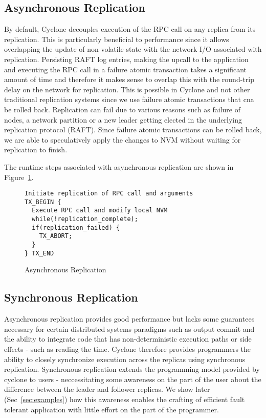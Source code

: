 \documentclass[twocolumn]{article}
\begin{document}
\subsection{Asynchronous Replication}
By default, Cyclone decouples execution of the RPC call on any replica from its
replication. This is particularly beneficial to performance since it allows
overlapping the update of non-volatile state with the network I/O associated
with replication. Persisting RAFT log entries, making the upcall to the
application and executing the RPC call in a failure atomic transaction takes a
significant amount of time and therefore it makes sense to overlap this with the
round-trip delay on the network for replication. This is possible in Cyclone and
not other traditional replication systems since we use failure atomic
transactions that cna be rolled back. Replication can fail due to various
reasons such as failure of nodes, a network partition or a new leader getting
elected in the underlying replication protocol (RAFT). Since failure atomic
transactions can be rolled back, we are able to speculatively apply the changes
to NVM without waiting for replication to finish.

The runtime steps associated with asynchronous replication are shown in
Figure~\ref{fig:async_rep}.

\begin{figure}
{ \scriptsize
\begin{verbatim}
Initiate replication of RPC call and arguments
TX_BEGIN {
  Execute RPC call and modify local NVM
  while(!replication_complete);
  if(replication_failed) {
    TX_ABORT;
  }
} TX_END
\end{verbatim}
}
\caption{Asynchronous Replication}
\label{fig:async_rep}
\end{figure}

\subsection{Synchronous Replication}
Asynchronous replication provides good performance but lacks some guarantees
necessary for certain distributed systems paradigms such as output commit and
the ability to integrate code that has non-deterministic execution paths or side
effects - such as reading the time. Cyclone therefore provides programmers the
ability to closely synchronize execution across the replicas using synchronous
replication. Synchronous replication extends the programming model provided by
cyclone to users - neccessitating some awareness on the part of the user about
the difference between the leader and follower replicas. We show later
(Sec~\ref{sec:examples}) how this awareness enables the crafting of efficient
fault tolerant application with little effort on the part of the programmer.
\end{document}
